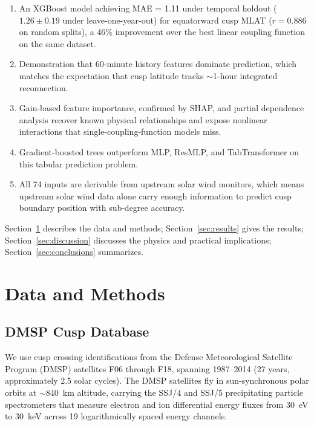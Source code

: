 \documentclass[draft]{agujournal2019}
\let\citep\cite
\begin{document}
\begin{enumerate}
\item An XGBoost model achieving MAE = 1.11\textdegree{} under temporal holdout ($1.26 \pm 0.19$\textdegree{} under leave-one-year-out) for equatorward cusp MLAT ($r = 0.886$ on random splits), a 46\% improvement over the best linear coupling function on the same dataset.
\item Demonstration that 60-minute history features dominate prediction, which matches the expectation that cusp latitude tracks $\sim$1-hour integrated reconnection.
\item Gain-based feature importance, confirmed by SHAP, and partial dependence analysis recover known physical relationships and expose nonlinear interactions that single-coupling-function models miss.
\item Gradient-boosted trees outperform MLP, ResMLP, and TabTransformer on this tabular prediction problem.
\item All 74 inputs are derivable from upstream solar wind monitors, which means upstream solar wind data alone carry enough information to predict cusp boundary position with sub-degree accuracy.
\end{enumerate}

Section~\ref{sec:data} describes the data and methods; Section~\ref{sec:results} gives the results; Section~\ref{sec:discussion} discusses the physics and practical implications; Section~\ref{sec:conclusions} summarizes.

\section{Data and Methods}
\label{sec:data}

\subsection{DMSP Cusp Database}

We use cusp crossing identifications from the Defense Meteorological Satellite Program (DMSP) satellites F06 through F18, spanning 1987--2014 (27 years, approximately 2.5 solar cycles). The DMSP satellites fly in sun-synchronous polar orbits at $\sim$840~km altitude, carrying the SSJ/4 and SSJ/5 precipitating particle spectrometers \citep{hardy1984ssj4, redmon2017dmsp} that measure electron and ion differential energy fluxes from 30~eV to 30~keV across 19 logarithmically spaced energy channels.
\end{document}
